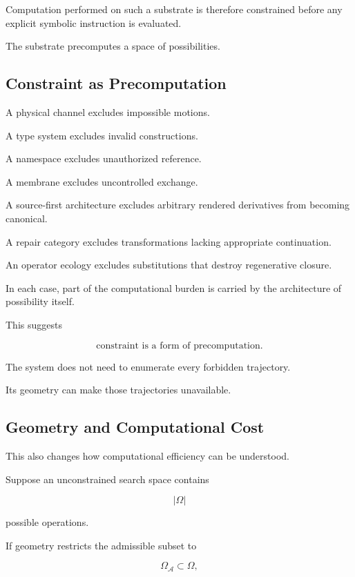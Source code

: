 \documentclass[11pt]{article}
\theoremstyle{remark}
\newcommand{\Adm}{\mathcal{A}}
\begin{document}
Computation performed on such a substrate is therefore constrained before any explicit symbolic instruction is evaluated.

The substrate precomputes a space of possibilities.

\subsection{Constraint as Precomputation}

A physical channel excludes impossible motions.

A type system excludes invalid constructions.

A namespace excludes unauthorized reference.

A membrane excludes uncontrolled exchange.

A source-first architecture excludes arbitrary rendered derivatives from becoming canonical.

A repair category excludes transformations lacking appropriate continuation.

An operator ecology excludes substitutions that destroy regenerative closure.

In each case, part of the computational burden is carried by the architecture of possibility itself.

This suggests

\begin{equation}
\boxed{
\text{constraint is a form of precomputation}.
}
\end{equation}

The system does not need to enumerate every forbidden trajectory.

Its geometry can make those trajectories unavailable.

\subsection{Geometry and Computational Cost}

This also changes how computational efficiency can be understood.

Suppose an unconstrained search space contains

\begin{equation}
|\Omega|
\end{equation}

possible operations.

If geometry restricts the admissible subset to

\begin{equation}
\Omega_{\Adm}\subset\Omega,
\end{equation}
\end{document}
